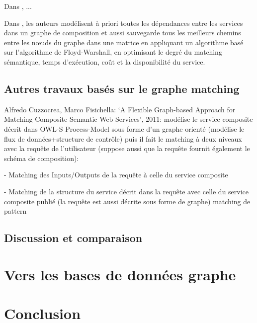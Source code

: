   \begin{text}
    Dans \cite{talantikite2009semantic}, ...
  \end{text}

  \begin{text}
    Dans \cite{elmaghraoui2011graph}, les auteurs modélisent à priori
    toutes les dépendances entre les services dans un graphe de
    composition et aussi sauvegarde tous les meilleurs chemins entre
    les nœuds du graphe dans une matrice en appliquant un algorithme
    basé sur l'algorithme de Floyd-Warshall, en optimisant le degré du
    matching sémantique, temps d'exécution, coût et la disponibilité
    du service.
  \end{text}

  \subsection{Autres travaux basés sur le graphe matching}
  \label{sec:autres-travaux}
  Alfredo Cuzzocrea, Marco Fisichella: ‘A Flexible Graph-based
  Approach for Matching Composite Semantic Web Services’, 2011:
  modélise le service composite décrit dans OWL-S Process-Model sous
  forme d’un graphe orienté (modélise le flux de données+structure de
  contrôle) puis il fait le matching à deux niveaux avec la requête de
  l’utilisateur (suppose aussi que la requête fournit également le
  schéma de composition):

  - Matching des Inputs/Outputs de la requête
  à celle du service composite

  - Matching de la structure du service décrit dans la requête avec
  celle du service composite publié (la requête est aussi décrite sous
  forme de graphe) matching de pattern
  \newpage
  \subsection{Discussion et comparaison}
  \label{sec:discussion-comparaison}

  
\newpage
\section{Vers les bases de données graphe}
\label{sec:vers-les-bases}

\section{Conclusion}
\label{sec:conclusion-2}

